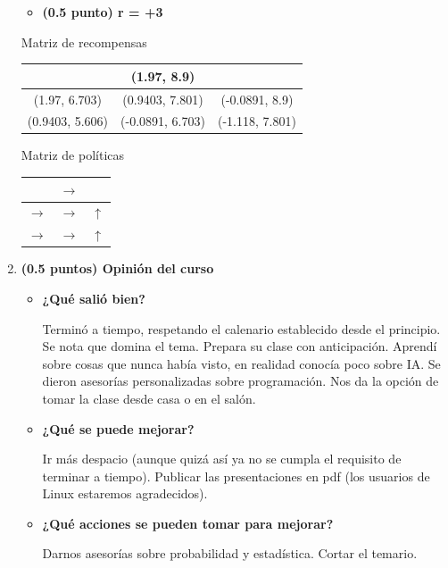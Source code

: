 \documentclass[a4paper,10pt]{article}
\begin{document}
\begin{enumerate}
\begin{itemize}
		\item \textbf{(0.5 punto) r = +3}
	\end{itemize}

Matriz de recompensas

\begin{tabular}{|c|c|c|}
\hline
& (1.97, 8.9) & \\ \hline
(1.97, 6.703) & (0.9403, 7.801) & (-0.0891, 8.9) \\ \hline
(0.9403, 5.606) & (-0.0891, 6.703) & (-1.118, 7.801) \\ \hline
\end{tabular}

Matriz de políticas

\begin{tabular}{|c|c|c|}
\hline
 & $\rightarrow$ & \\ \hline
$\rightarrow$ & $\rightarrow$ & $\uparrow$ \\ \hline
$\rightarrow$ & $\rightarrow$ & $\uparrow$ \\ \hline
\end{tabular}

    \item \textbf{(0.5 puntos) Opinión del curso}
    \begin{itemize}
     \item \textbf{¿Qué salió bien?}
     
     Terminó a tiempo, respetando el calenario establecido desde el principio. Se nota que domina el tema. Prepara su clase con anticipación. Aprendí sobre cosas que nunca había visto, en realidad conocía poco sobre IA. Se dieron asesorías personalizadas sobre programación. Nos da la opción de tomar la clase desde casa o en el salón.

     \item \textbf{¿Qué se puede mejorar?}
     
     Ir más despacio (aunque quizá así ya no se cumpla el requisito de terminar a tiempo). Publicar las presentaciones en pdf (los usuarios de Linux estaremos agradecidos).
     
     \item \textbf{¿Qué acciones se pueden tomar para mejorar?}
     
     Darnos asesorías sobre probabilidad y estadística. Cortar el temario.

    \end{itemize}

 
\end{enumerate}
\end{document}
